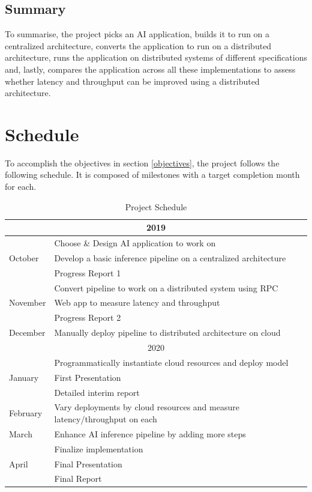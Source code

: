 \documentclass{report}
\begin{document}
\section{Summary}
To summarise, the project picks an AI application, builds it to run on a centralized architecture, converts the application to run on a distributed architecture, runs the application on distributed systems of different specifications and, lastly, compares the application across all these implementations to assess whether latency and throughput can be improved using a distributed architecture.

\chapter{Schedule}\label{chap:schedule}
To accomplish the objectives in section \ref{objectives}, the project follows the following schedule.
It is composed of milestones with a target completion month for each.
\begin{table}[h!]
  \begin{center}
    \caption{Project Schedule}
    \label{tab:table1}
    \begin{tabular}{ |l|l| } 
      \hline
      \multicolumn{2}{|c|}{2019} \\ \hline
      \multirow{3}{*}{October} & Choose \& Design AI application to work on \\
       & Develop a basic inference pipeline on a centralized architecture \\
       & Progress Report 1 \\ \hline
      \multirow{3}{*}{November} & Convert pipeline to work on a distributed system using RPC \\
       & Web app to measure latency and throughput \\
       & Progress Report 2 \\ \hline
      December & Manually deploy pipeline to distributed architecture on cloud \\ \hline
      \multicolumn{2}{|c|}{2020} \\ \hline
      \multirow{3}{*}{January} & Programmatically instantiate cloud resources and deploy model \\
       & First Presentation \\
       & Detailed interim report \\ \hline
      February     & Vary deployments by cloud resources and measure latency/throughput on each  \\ \hline
      March     & Enhance AI inference pipeline by adding more steps  \\ \hline
      \multirow{3}{*}{April} & Finalize implementation \\
       & Final Presentation \\
       & Final Report \\ \hline
      \end{tabular}
  \end{center}
\end{table}
\end{document}

